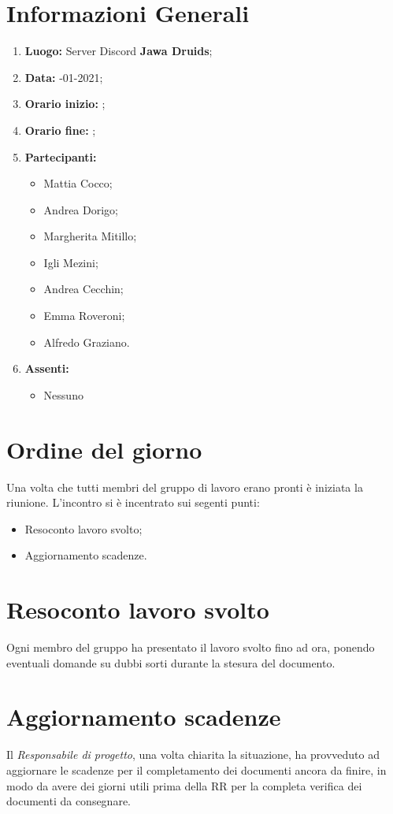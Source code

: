 	\newpage
	\section{Informazioni Generali}
	\begin{enumerate}
		\item \textbf{Luogo:} \normalfont Server Discord \textbf{Jawa Druids};
		\item \textbf{Data:} -01-2021;
		\item \textbf{Orario inizio:} ;
		\item \textbf{Orario fine:} ;
		\item \textbf{Partecipanti:}
		\begin{itemize}
			\item Mattia Cocco;
			\item Andrea Dorigo;
			\item Margherita Mitillo;
			\item Igli Mezini;
			\item Andrea Cecchin;
			\item Emma Roveroni;
			\item Alfredo Graziano.
		\end{itemize}
		\item \textbf{Assenti:}
		\begin{itemize}
			\item Nessuno
		\end{itemize}
	\end{enumerate}
	\section{Ordine del giorno}
	Una volta che tutti membri del gruppo di lavoro erano pronti è iniziata la riunione. L'incontro si è incentrato sui segenti punti:
	\begin{itemize}
		\item Resoconto lavoro svolto;
		\item Aggiornamento scadenze.
	\end{itemize}

	\section{Resoconto lavoro svolto}
	Ogni membro del gruppo ha presentato il lavoro svolto fino ad ora, ponendo eventuali domande su dubbi sorti durante la stesura del documento.

	\section{Aggiornamento scadenze}
	Il \textit{Responsabile di progetto}, una volta chiarita la situazione, ha provveduto ad aggiornare le scadenze per il completamento dei documenti ancora da finire, in modo da avere dei giorni utili prima della RR per la completa verifica dei documenti da consegnare.

